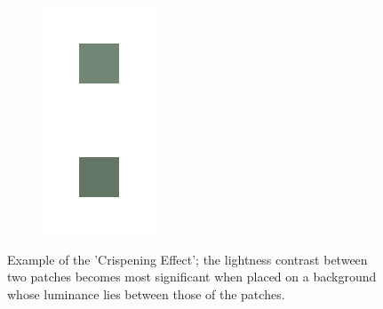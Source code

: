 \documentclass[journal,onecolumn]{IEEEtran}
\begin{document}
\begin{figure}[h]
\begin{subfigure}[b]{0.2\textwidth}
                \includegraphics[width=.85\linewidth, frame]{crisp_3}
                \caption{}
                \label{fig:crispening-effect-c}
        \end{subfigure}
        \caption{Example of the 'Crispening Effect'; the lightness contrast between two patches becomes most significant when placed on a background whose luminance lies between those of the patches.}
\end{figure}
\end{document}
